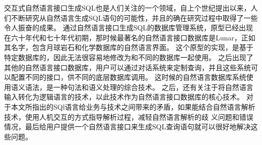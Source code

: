 
交互式自然语言接口生成SQL\cite{Androutsopoulos1995Natural}也是人们关注的一个领域，自上个世纪提出以来，人们不断研究从自然语言生成SQL语句的可能性，并且的确在研究过程中取得了一些令人振奋的成果。
通过自然语言接口生成SQL的数据库管理系统，原型已经出现在六十年代和七十年代初期，那时候最著名的自然语言接口数据库是Lunar，正如其名字，包含月球岩石和化学数据库的自然语言界面。
这个原型的实现，是基于特定数据库的，因此无法很容易地修改为和不同的数据库一起使用。
之后出现了其他的自然语言接口数据库，用户可以通过对话系统来定制查询，并且这些系统可以配置不同的接口，供不同的底层数据库调用。
这时候的自然语言数据库系统使用语义语法，是一种句法和语义处理的综合技术。
之后，还有关注于将自然语言输入转化为逻辑语言的技术，以此技术作为自然语言接口数据库的核心技术。
对于本文所指出的SQl语言给业务与技术之间带来的矛盾，如果能结合自然语言解析技术，使用人机交互的方式指导解析过程，减轻自然语言解析的歧
义问题和错误情况，最后给用户提供一个自然语言接口来生成SQL查询语句就可以很好地解决这些问题。

